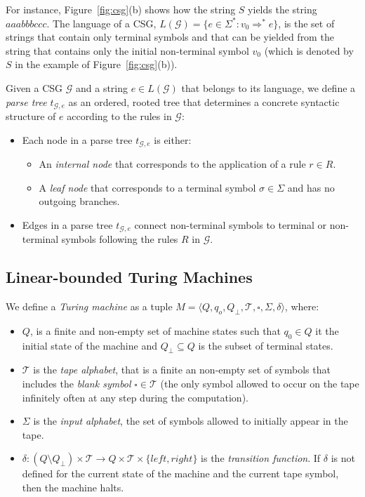 \documentclass[letterpaper]{article} %
\newcommand{\tup}[1]{{\langle #1 \rangle}}
\begin{document}
For instance, Figure~\ref{fig:csg}(b) shows how the string $S$ yields the string $aaabbbccc$. The language of a CSG, $L(\mathcal{G})=\{e\in \Sigma^*: v_0\Rightarrow^* e\}$, is the set of strings that contain only terminal symbols and that can be yielded from the string that contains only the initial non-terminal symbol $v_0$ (which is denoted by $S$ in the example of Figure~\ref{fig:csg}(b)).

Given a CSG $\mathcal{G}$ and a string $e\in L(\mathcal{G})$ that belongs to its language, we define a {\it parse tree} $t_{\mathcal{G},e}$ as an ordered, rooted tree that determines a concrete syntactic structure of $e$ according to the rules in $\mathcal{G}$:
\begin{itemize}
\item Each node in a parse tree $t_{\mathcal{G},e}$ is either:
\begin{itemize}
\item An {\it internal node} that corresponds to the application of a rule $r\in R$.
\item A {\it leaf node} that corresponds to a terminal symbol $\sigma\in \Sigma$ and has no outgoing branches.
\end{itemize}
\item Edges in a parse tree $t_{\mathcal{G},e}$ connect non-terminal symbols to terminal or non-terminal symbols following the rules $R$ in $\mathcal{G}$.
\end{itemize}


\subsection{Linear-bounded Turing Machines}
We define a {\em Turing machine} as a tuple $M=\tup{Q,q_o,Q_{\bot},\mathcal{T},\square,\Sigma,\delta}$, where:
\begin{itemize}
\item $Q$, is a finite and non-empty set of machine states such that $q_0\in Q$ it the initial state of the machine and $Q_{\bot}\subseteq Q$ is the subset of terminal states.  
\item $\mathcal{T}$ is the {\em tape alphabet}, that is a finite an non-empty set of symbols that includes the {\em blank symbol} $\square\in\mathcal{T}$ (the only symbol allowed to occur on the tape infinitely often at any step during the computation).
\item $\Sigma$ is the {\em input alphabet}, the set of symbols allowed to initially appear in the tape.
\item $\delta: (Q\setminus Q_{\bot})\times \mathcal{T}\rightarrow Q\times \mathcal{T}\times\{left,right\}$ is the {\em transition function}. If $\delta$ is not defined for the current state of the machine and the current tape symbol, then the machine halts.
\end{itemize}
\end{document}
